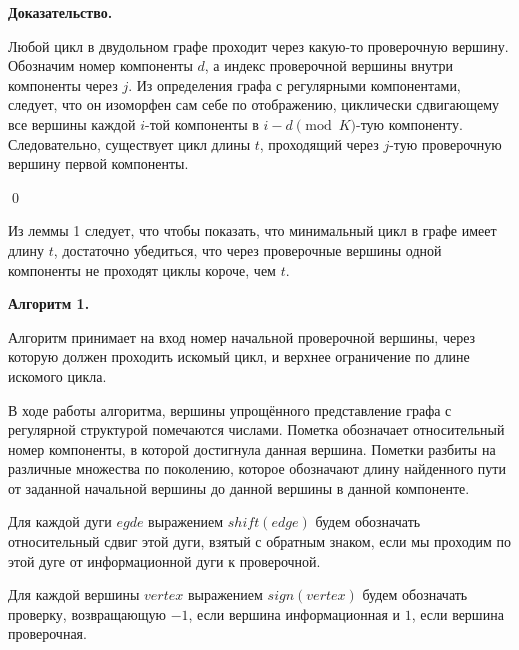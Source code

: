 \documentclass[14pt]{mmcs_article}
\begin{document}
\textbf{Доказательство.}

Любой цикл в двудольном графе проходит через какую-то проверочную вершину. Обозначим номер компоненты $d$, а индекс проверочной вершины внутри компоненты через $j$. Из определения графа с регулярными компонентами, следует, что он изоморфен сам себе по отображению, циклически сдвигающему все вершины каждой $i$-той компоненты в $i - d \pmod K$-тую компоненту. Следовательно, существует цикл длины $t$, проходящий через $j$-тую проверочную вершину первой компоненты.

\qed

Из леммы 1 следует, что чтобы показать, что минимальный цикл в графе имеет длину $t$, достаточно убедиться, что через проверочные вершины одной компоненты не проходят циклы короче, чем $t$.

\textbf{Алгоритм 1.} 

Алгоритм принимает на вход номер начальной проверочной вершины, через которую должен проходить искомый цикл, и верхнее ограничение по длине искомого цикла.

В ходе работы алгоритма, вершины упрощённого представление графа с регулярной структурой помечаются числами. Пометка обозначает относительный номер компоненты, в которой достигнула данная вершина. Пометки разбиты на различные множества по поколению, которое обозначают длину найденного пути от заданной начальной вершины до данной вершины в данной компоненте.

Для каждой дуги $egde$ выражением $shift(edge)$ будем обозначать относительный сдвиг этой дуги, взятый с обратным знаком, если мы проходим по этой дуге от информационной дуги к проверочной.

Для каждой вершины $vertex$ выражением $sign(vertex)$ будем обозначать проверку, возвращающую $-1$, если вершина информационная и $1$, если вершина проверочная.
\end{document}
